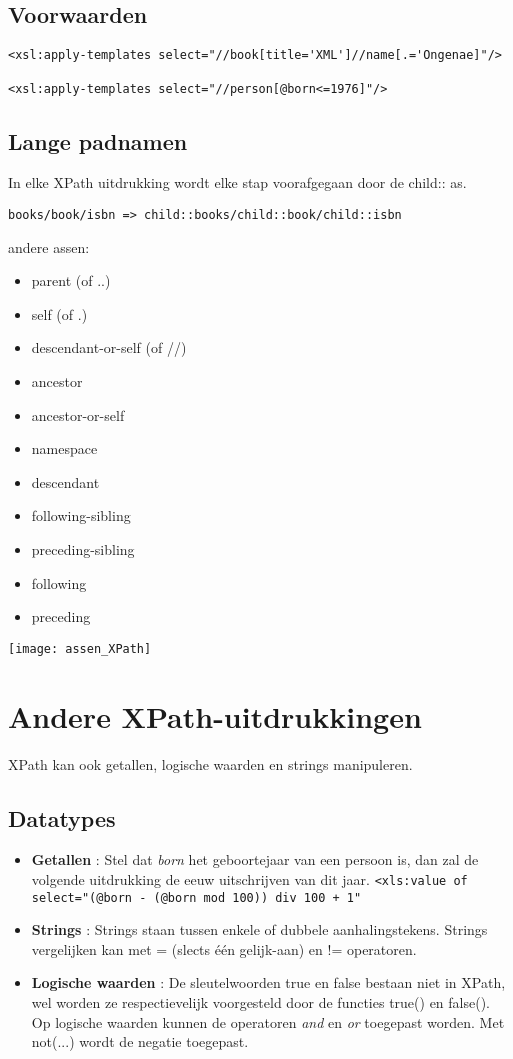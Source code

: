 \documentclass{report}
\begin{document}
	\subsection{Voorwaarden}
	\begin{lstlisting}
<xsl:apply-templates select="//book[title='XML']//name[.='Ongenae]"/>
	
<xsl:apply-templates select="//person[@born<=1976]"/>
	\end{lstlisting}
	\subsection{Lange padnamen}
	In elke XPath uitdrukking wordt elke stap voorafgegaan door de child:: as.
	
	\texttt{books/book/isbn => child::books/child::book/child::isbn}
	
	andere assen:
	\begin{itemize}
		\item parent (of ..)
		\item self (of .)
		\item descendant-or-self (of //)
		\item ancestor 
		\item ancestor-or-self
		\item namespace
		\item descendant
		\item following-sibling
		\item preceding-sibling
		\item following
		\item preceding
	\end{itemize}
	\texttt{[image: assen\_XPath]}
	
	\section{Andere XPath-uitdrukkingen}
	XPath kan ook getallen, logische waarden en strings manipuleren.
	\subsection{Datatypes}
	\begin{itemize}
		\item \textbf{Getallen} : Stel dat \textit{born} het geboortejaar van een persoon is, dan zal de volgende uitdrukking de eeuw uitschrijven van dit jaar.
		\texttt{<xls:value of select="(@born - (@born mod 100)) div 100 + 1"}
		
		\item \textbf{Strings} : Strings staan tussen enkele of dubbele aanhalingstekens. Strings vergelijken kan met = (slects één gelijk-aan) en != operatoren.
		
	
		\item \textbf{Logische waarden} : De sleutelwoorden true en false bestaan niet in XPath, wel worden ze respectievelijk voorgesteld door de functies true() en false(). Op logische waarden kunnen de operatoren \textit{and} en \textit{or} toegepast worden. Met not(...) wordt de negatie toegepast.
		
	\end{itemize}
\end{document}
